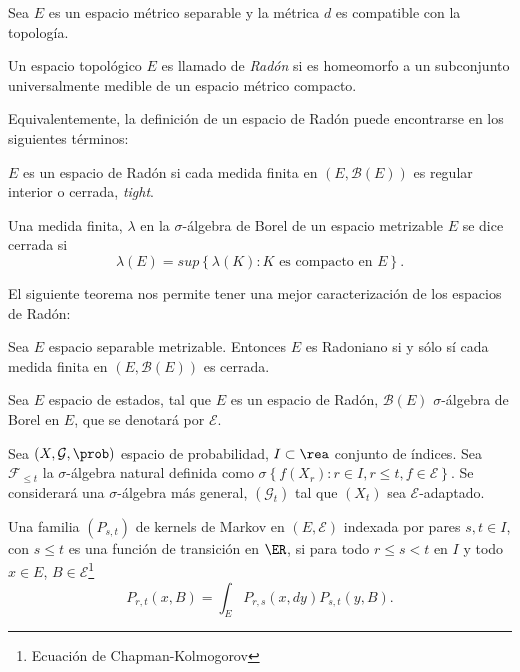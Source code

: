 Sea $E$ es un espacio m\'etrico separable y la m\'etrica $d$ es
compatible con la topolog\'ia.


\begin{Def}
Un espacio topol\'ogico $E$ es llamado de {\em Rad\'on} si es
homeomorfo a un subconjunto universalmente medible de un espacio
m\'etrico compacto.
\end{Def}

Equivalentemente, la definici\'on de un espacio de Rad\'on puede
encontrarse en los siguientes t\'erminos:


\begin{Def}
$E$ es un espacio de Rad\'on si cada medida finita en
$\left(E,\mathcal{B}\left(E\right)\right)$ es regular interior o
cerrada, {\em tight}.
\end{Def}

\begin{Def}
Una medida finita, $\lambda$ en la $\sigma$-\'algebra de Borel de
un espacio metrizable $E$ se dice cerrada si
\begin{equation}\label{Eq.A2.3}
\lambda\left(E\right)=sup\left\{\lambda\left(K\right):K\textrm{ es
compacto en }E\right\}.
\end{equation}
\end{Def}

El siguiente teorema nos permite tener una mejor caracterizaci\'on
de los espacios de Rad\'on:
\begin{Teo}\label{Tma.A2.2}
Sea $E$ espacio separable metrizable. Entonces $E$ es Radoniano si
y s\'olo s\'i cada medida finita en
$\left(E,\mathcal{B}\left(E\right)\right)$ es cerrada.
\end{Teo}

Sea $E$ espacio de estados, tal que $E$ es un espacio de Rad\'on,
$\mathcal{B}\left(E\right)$ $\sigma$-\'algebra de Borel en $E$,
que se denotar\'a por $\mathcal{E}$.

Sea $\left(X,\mathcal{G},\prob\right)$ espacio de probabilidad,
$I\subset\rea$ conjunto de \'indices. Sea $\mathcal{F}_{\leq t}$
la $\sigma$-\'algebra natural definida como
$\sigma\left\{f\left(X_{r}\right):r\in I, r\leq
t,f\in\mathcal{E}\right\}$. Se considerar\'a una
$\sigma$-\'algebra m\'as general, $ \left(\mathcal{G}_{t}\right)$
tal que $\left(X_{t}\right)$ sea $\mathcal{E}$-adaptado.

\begin{Def}
Una familia $\left(P_{s,t}\right)$ de kernels de Markov en
$\left(E,\mathcal{E}\right)$ indexada por pares $s,t\in I$, con
$s\leq t$ es una funci\'on de transici\'on en $\ER$, si  para todo
$r\leq s< t$ en $I$ y todo $x\in E$,
$B\in\mathcal{E}$\footnote{Ecuaci\'on de Chapman-Kolmogorov}
\begin{equation}\label{Eq.Kernels}
P_{r,t}\left(x,B\right)=\int_{E}P_{r,s}\left(x,dy\right)P_{s,t}\left(y,B\right).
\end{equation}
\end{Def}

